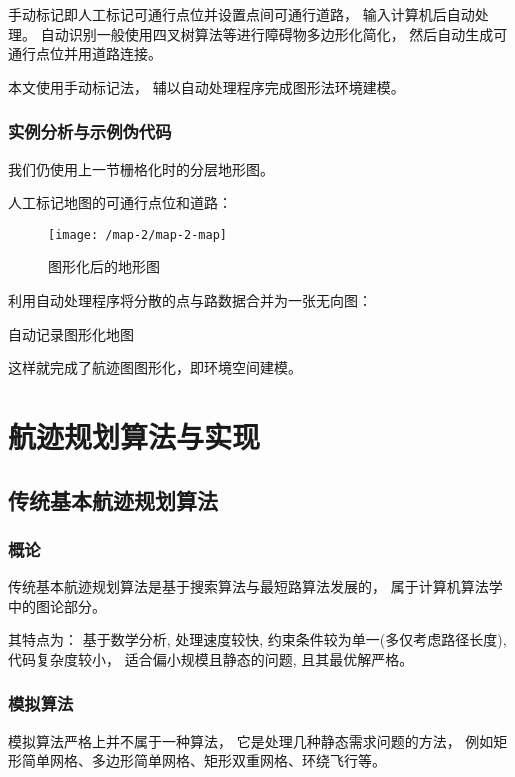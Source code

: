 \documentclass[oneside,UTF8]{ctexart}
\numberwithin{figure}{section} %
\begin{document}
手动标记即人工标记可通行点位并设置点间可通行道路，
输入计算机后自动处理。
自动识别一般使用四叉树算法等进行障碍物多边形化简化，
然后自动生成可通行点位并用道路连接。

本文使用手动标记法，
辅以自动处理程序完成图形法环境建模。
\subsubsection{实例分析与示例伪代码}
我们仍使用上一节栅格化时的分层地形图。

人工标记地图的可通行点位和道路：
\begin{figure}[H]
  \centering
  \texttt{[image: /map-2/map-2-map]}
  \caption{图形化后的地形图}
  \label{fig:map-2-map}
\end{figure}

利用自动处理程序将分散的点与路数据合并为一张无向图：

\begin{algorithm}[H]
  \caption{自动记录图形化地图}\label{algorithm-map-noted}

\end{algorithm}

这样就完成了航迹图图形化，即环境空间建模。
\newpage\section{航迹规划算法与实现}
\subsection{传统基本航迹规划算法}
\subsubsection{概论}
传统基本航迹规划算法是基于搜索算法与最短路算法发展的，
属于计算机算法学中的图论部分。

其特点为：
基于数学分析,
处理速度较快,
约束条件较为单一(多仅考虑路径长度),
代码复杂度较小，
适合偏小规模且静态的问题,
且其最优解严格。

\subsubsection{模拟算法}
模拟算法严格上并不属于一种算法，
它是处理几种静态需求问题的方法，
例如矩形简单网格、多边形简单网格、矩形双重网格、环绕飞行等。
\end{document}
